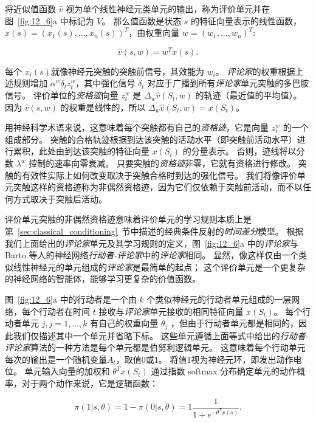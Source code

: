 将近似值函数 $\hat{v}$ 视为单个线性神经元类单元的输出，称为评价单元并在图~\ref{fig:12_6}a 中标记为 $V$。
那么值函数是状态 $s$ 的特征向量表示的线性函数，$x(s) = (x_1(s), ..., x_n(s))^T$，由权重向量 $w = (w_1, ..., w_n) ^T$:

\begin{equation} \label{eq:15_1}
	\hat{v}(s, w) = w^T x(s).
\end{equation}


每个 $x_i(s)$就像神经元突触的突触前信号，其效能为 $w_i$。
\textit{评论家}的权重根据上述规则增加 $\alpha^w \delta_t z_t^w$，其中强化信号 $\delta_t$ 对应于广播到所有\textit{评论家}单元突触的多巴胺信号。
评价单位的\textit{资格迹}向量 $z_t^w$ 是 $\Delta_w \hat{v} (S_t, w)$ 的轨迹（最近值的平均值）。
因为 $\hat{v}(s, w)$ 的权重是线性的，所以 $\Delta_w \hat{v} (S_t, w) = x(S_t)$。


用神经科学术语来说，这意味着每个突触都有自己的\textit{资格迹}，它是向量 $z_t^w$ 的一个组成部分。
突触的合格轨迹根据到达该突触的活动水平（即突触前活动水平）进行累积，此处由到达该突触的特征向量 $x(S_t)$ 的分量表示。
否则，迹线将以分数 $\lambda ^w$ 控制的速率向零衰减。
只要突触的\textit{资格迹}非零，它就有资格进行修改。
突触的有效性实际上如何改变取决于突触合格时到达的强化信号。
我们将像评价单元突触这样的资格迹称为非偶然资格迹，因为它们仅依赖于突触前活动，而不以任何方式取决于突触后活动。


评价单元突触的非偶然资格迹意味着评价单元的学习规则本质上是第~\ref{sec:classical_conditioning}~节中描述的经典条件反射的\textit{时间差分}模型。
根据我们上面给出的\textit{评论家}单元及其学习规则的定义，图~\ref{fig:12_6}a 中的\textit{评论家}与 Barto 等人的神经网络\textit{行动者-评论家}中的\textit{评论家}相同\cite{barto13neuron}。
显然，像这样仅由一个类似线性神经元的单元组成的\textit{评论家}是最简单的起点；
这个评价单元是一个更复杂的神经网络的智能体，能够学习更复杂的价值函数。


图~\ref{fig:12_6}a 中的行动者是一个由 $k$ 个类似神经元的行动者单元组成的一层网络，每个行动者在时间 $t$ 接收与\textit{评论家}单元接收的相同特征向量 $x(S_t)$。
每个行动者单元 $j, j=1, ..., k$ 有自己的权重向量 $\theta_j$ ，但由于行动者单元都是相同的，因此我们仅描述其中一个单元并省略下标。
这些单元遵循上面等式中给出的\textit{行动者-评论家}算法的一种方法是每个单元都是伯努利逻辑单元。
这意味着每个行动单元每次的输出是一个随机变量$A_t$，取值0或1。
将值1视为神经元环，即发出动作电位。
单元输入向量的加权和 $\theta^T x(S_t)$ 通过指数 softmax 分布确定单元的动作概率，对于两个动作来说，它是逻辑函数：

\begin{equation} \label{eq:15_2}
	\pi (1|s, \theta) = 
		1 - \pi(0|s, \theta) 
		= 1 \frac{1}{1 + e^{-\theta^T x(s)}}.
\end{equation}


